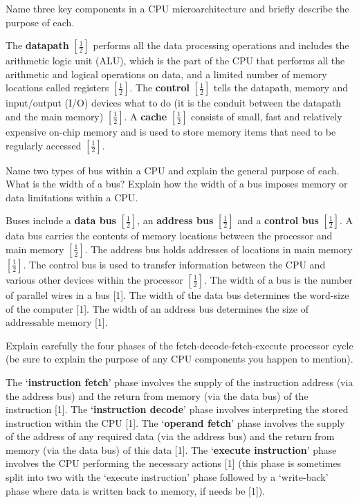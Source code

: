 \documentclass{exam}
\begin{document}
\begin{questions}
\begin{solution}[.2in]
\end{solution}
\question[3]Name three key components in a CPU microarchitecture and briefly
describe the purpose of each.
\begin{solution}[.2in]
The \textbf{datapath} $[\frac{1}{2}]$ performs all the data processing operations and includes
the arithmetic logic unit (ALU), which is the part of the CPU
that performs all the arithmetic and logical operations on data, and a
limited number of memory locations called registers $[\frac{1}{2}]$. The \textbf{control}
$[\frac{1}{2}]$ tells the datapath, memory and input/output (I/O) devices what
to do (it is the conduit between the datapath and the main memory) $[\frac{1}{2}]$. A \textbf{cache} $[\frac{1}{2}]$ consists of small, fast and relatively expensive on-chip
memory and is used to store memory items that need to be regularly
accessed $[\frac{1}{2}]$.
\end{solution}
\newpage
\question[6]Name two types of bus within a CPU and explain the general purpose
of each. What is the width of a bus? Explain how the width of a bus
imposes memory or data limitations within a CPU.
\begin{solution}[.2in]
	Buses include a \textbf{data bus} $[\frac{1}{2}]$, an \textbf{address bus} $[\frac{1}{2}]$ and a \textbf{control bus} $[\frac{1}{2}]$. A data bus carries the contents of memory locations between the
	processor and main memory $[\frac{1}{2}]$. The address bus holds addresses of
	locations in main memory $[\frac{1}{2}]$. The control bus is used to transfer
	information between the CPU and various other devices within the
	processor $[\frac{1}{2}]$. The width of a bus is the number of parallel wires in
	a bus [1]. The width of the data bus determines the word-size of the
	computer [1]. The width of an address bus determines the size of
	addressable memory [1].
\end{solution}

\question[5]Explain carefully the four phases of the fetch-decode-fetch-execute processor cycle (be sure to explain the purpose of any CPU components
you happen to mention).
\begin{solution}[.2in]
The ‘\textbf{instruction fetch}’ phase involves the supply of the instruction address
(via the address bus) and the return from memory (via the data
bus) of the instruction [1]. The ‘\textbf{instruction decode}’ phase involves
interpreting the stored instruction within the CPU [1]. The ‘\textbf{operand
	fetch}’ phase involves the supply of the address of any required data (via
the address bus) and the return from memory (via the data bus) of this
data [1]. The ‘\textbf{execute instruction}’ phase involves the CPU performing
the necessary actions [1] (this phase is sometimes split into two with
the ‘execute instruction’ phase followed by a ‘write-back’ phase where
data is written back to memory, if needs be [1]).
\end{solution}


\end{questions}
\end{document}
